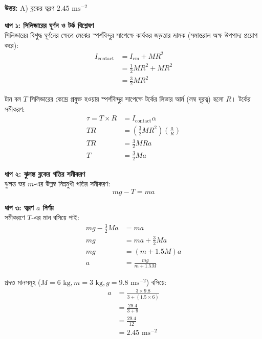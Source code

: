 \documentclass[12pt, a4paper]{article}
\begin{document}
\vspace{0.5em}
\begin{tcolorbox}[answerbox]
    \textbf{\color{success} উত্তর:} A) ব্লকের ত্বরণ $2.45\text{ ms}^{-2}$
\end{tcolorbox}
\vspace{1em}

\begin{tcolorbox}[solutionbox={সমাধান (Solution)}]
    \noindent
    \textbf{ধাপ ১: সিলিন্ডারের ঘূর্ণন ও টর্ক বিশ্লেষণ} \\
    সিলিন্ডারের বিশুদ্ধ ঘূর্ণনের ক্ষেত্রে মেঝের স্পর্শবিন্দুর সাপেক্ষে কার্যকর জড়তার ভ্রামক (সমান্তরাল অক্ষ উপপাদ্য প্রয়োগ করে):
    \begin{align*}
        I_{\text{contact}} &= I_{\text{cm}} + M R^2 \\
        &= \frac{1}{2} M R^2 + M R^2 \\
        &= \frac{3}{2} M R^2
    \end{align*}
    
    টান বল $T$ সিলিন্ডারের কেন্দ্রে প্রযুক্ত হওয়ায় স্পর্শবিন্দুর সাপেক্ষে টর্কের লিভার আর্ম (লম্ব দূরত্ব) হলো $R$। টর্কের সমীকরণ:
    \begin{align*}
        \tau = T \times R &= I_{\text{contact}} \alpha \\
        T R &= \left(\frac{3}{2} M R^2\right) \left(\frac{a}{R}\right) \\
        T R &= \frac{3}{2} M R a \\
        T &= \frac{3}{2} M a
    \end{align*}
    
    \vspace{0.5em}
    \noindent\textbf{ধাপ ২: ঝুলন্ত ব্লকের গতির সমীকরণ} \\
    ঝুলন্ত ভর $m$-এর উল্লম্ব নিম্নমুখী গতির সমীকরণ:
    \[ m g - T = m a \]
    
    \vspace{0.5em}
    \noindent\textbf{ধাপ ৩: ত্বরণ $a$ নির্ণয়} \\
    সমীকরণে $T$-এর মান বসিয়ে পাই:
    \begin{align*}
        m g - \frac{3}{2} M a &= m a \\
        m g &= m a + \frac{3}{2} M a \\
        m g &= \left(m + 1.5 M\right) a \\
        a &= \frac{m g}{m + 1.5 M}
    \end{align*}
    
    প্রদত্ত মানসমূহ ($M = 6\text{ kg}, m = 3\text{ kg}, g = 9.8\text{ ms}^{-2}$) বসিয়ে:
    \begin{align*}
        a &= \frac{3 \times 9.8}{3 + (1.5 \times 6)} \\
          &= \frac{29.4}{3 + 9} \\
          &= \frac{29.4}{12} \\
          &= \mathbf{2.45}\text{ ms}^{-2}
    \end{align*}
\end{tcolorbox}
\end{document}
